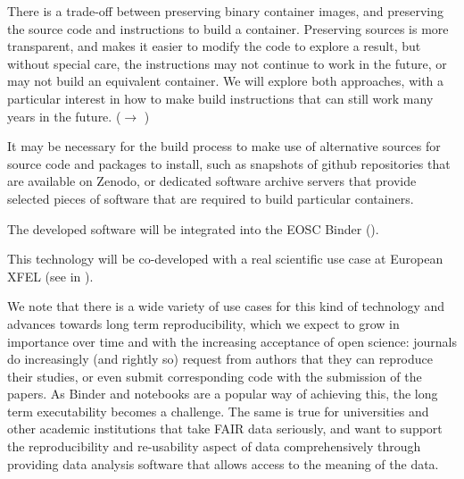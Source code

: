 \begin{task}[
  title=Archiving software environments for reproducible computation,
  id=reproducibility,
  lead=XFEL,
  PM=42,
  wphases={0-36},
  partners={EGI,QS,SRL,UPSUD,WTT}
]
\begin{compactitem}
  There is a trade-off between preserving binary container images, and
  preserving the source code and instructions to build a container.
  Preserving sources is more transparent, and makes it easier to
  modify the code to explore a result, but without special care, the
  instructions may not continue to work in the future, or may not
  build an equivalent container.  We will explore both approaches,
  with a particular interest in how to make build instructions that
  can still work many years in the future.  ($\rightarrow$
  )

  It may be necessary for the build process to make use of alternative
  sources for source code and packages to install, such as snapshots
  of github repositories that are available on Zenodo, or dedicated
  software archive servers that provide selected pieces of software
  that are required to build particular containers.

  The developed software will be integrated into the EOSC Binder
  ().
  \end{compactitem}



This technology will be co-developed with a real scientific use case at
European XFEL (see  in
).

  We note that there is a wide variety of use cases for this kind of
  technology and advances towards long term reproducibility, which we
  expect to grow in importance over time and with the increasing
  acceptance of open science: journals do increasingly (and rightly
  so) request from authors that they can reproduce their studies, or
  even submit corresponding code with the submission of the papers. As
  Binder and notebooks are a popular way of achieving this, the long
  term executability becomes a challenge. The same is true for
  universities and other academic institutions that take FAIR data
  seriously, and want to support the reproducibility and re-usability
  aspect of data comprehensively through providing data analysis
  software that allows access to the meaning of the data.
\end{task}
